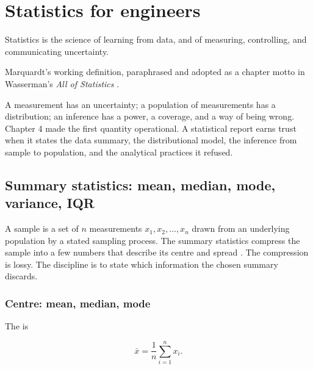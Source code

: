 \chapter{Statistics for engineers}
\label{vol01:ch08}

\epigraph{Statistics is the science of learning from data, and of
measuring, controlling, and communicating uncertainty.}{Marquardt's
working definition, paraphrased and adopted as a chapter motto in
Wasserman's \emph{All of Statistics} \cite[p.~vii]{text:wasserman2004}.}


\noindent
A measurement has an uncertainty; a population of measurements has a
distribution; an inference has a power, a coverage, and a way of
being wrong. Chapter 4 made the first quantity operational. A
statistical report earns trust when it states the data summary, the
distributional model, the inference from sample to population, and
the analytical practices it refused.

\section{Summary statistics: mean, median, mode, variance, IQR}

A sample is a set of $n$ measurements $x_{1}, x_{2}, \ldots, x_{n}$
drawn from an underlying population by a stated sampling process.
The summary statistics compress the sample into a few numbers that
describe its centre and spread \cite[ch.~6]{text:wasserman2004}. The
compression is lossy. The discipline is to state which information
the chosen summary discards.

\subsection{Centre: mean, median, mode}

The  is

\[
\bar{x} = \frac{1}{n}\sum_{i=1}^{n} x_{i}.
\]

